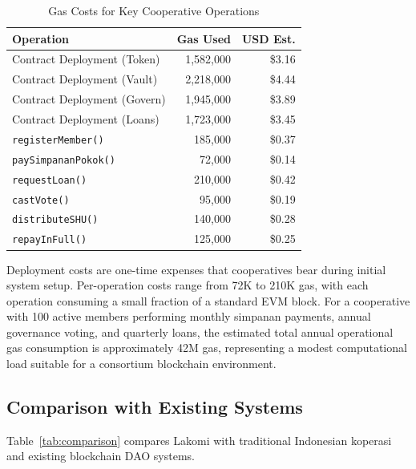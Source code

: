 \documentclass[conference]{IEEEtran}
\begin{document}
\begin{table}[htbp]
\centering
\caption{Gas Costs for Key Cooperative Operations}
\label{tab:gas}
\begin{tabular}{lrr}
\toprule
\textbf{Operation} & \textbf{Gas Used} & \textbf{USD Est.} \\
\midrule
Contract Deployment (Token) & 1,582,000 & \$3.16 \\
Contract Deployment (Vault) & 2,218,000 & \$4.44 \\
Contract Deployment (Govern) & 1,945,000 & \$3.89 \\
Contract Deployment (Loans) & 1,723,000 & \$3.45 \\
\texttt{registerMember()} & 185,000 & \$0.37 \\
\texttt{paySimpananPokok()} & 72,000 & \$0.14 \\
\texttt{requestLoan()} & 210,000 & \$0.42 \\
\texttt{castVote()} & 95,000 & \$0.19 \\
\texttt{distributeSHU()} & 140,000 & \$0.28 \\
\texttt{repayInFull()} & 125,000 & \$0.25 \\
\bottomrule
\end{tabular}
\end{table}

Deployment costs are one-time expenses that cooperatives bear during initial system setup. Per-operation costs range from 72K to 210K gas, with each operation consuming a small fraction of a standard EVM block. For a cooperative with 100 active members performing monthly simpanan payments, annual governance voting, and quarterly loans, the estimated total annual operational gas consumption is approximately 42M gas, representing a modest computational load suitable for a consortium blockchain environment.

\subsection{Comparison with Existing Systems}

Table~\ref{tab:comparison} compares Lakomi with traditional Indonesian koperasi and existing blockchain DAO systems.
\end{document}
